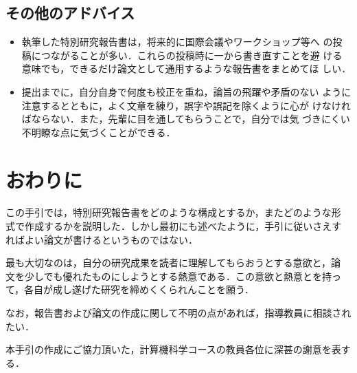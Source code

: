 \documentclass[master]{kuisthesis}		%
\def\|{\verb|}
\begin{document}
%% 雑誌に対しては，その「巻」と「発行年」のほか，「号」および（または）「月」を
%% 入れたほうが検索に便利である．号と月の入れ方はつぎの例による．
%% \begin{eqnarray*}
%% &\hbox{第4巻，第10号，1995年，10月発行の雑誌}\\
%% &\Big\Downarrow\\
%% &\hbox{Vol.~4, No.~10 (Oct.~1995)}.
%% \end{eqnarray*}

\subsection{その他のアドバイス}\label{subsec-others}


\begin{itemize}
  \item 執筆した特別研究報告書は，将来的に国際会議やワークショップ等へ
    の投稿につながることが多い．これらの投稿時に一から書き直すことを避
    ける意味でも，できるだけ論文として通用するような報告書をまとめてほ
    しい．
  \item 提出までに，自分自身で何度も校正を重ね，論旨の飛躍や矛盾のない
    ように注意するとともに，よく文章を練り，誤字や誤記を除くように心が
    けなければならない．また，先輩に目を通してもらうことで，自分では気
    づきにくい不明瞭な点に気づくことができる．
\end{itemize}

\section{おわりに}\label{sec-conclusion}

この手引では，特別研究報告書をどのような構成とするか，またどのような形
式で作成するかを説明した．しかし最初にも述べたように，手引に従いさえす
ればよい論文が書けるというものではない．

最も大切なのは，自分の研究成果を読者に理解してもらおうとする意欲と，論
文を少しでも優れたものにしようとする熱意である．この意欲と熱意とを持っ
て，各自が成し遂げた研究を締めくくられんことを願う．

なお，報告書および論文の作成に関して不明の点があれば，指導教員に相談されたい．

\acknowledgments				% 謝辞
本手引の作成にご協力頂いた，計算機科学コースの教員各位に深甚の謝意を表する．

\nocite{*}
			% 文献スタイルの指定
				% 参考文献の出力

						% 付録の開始
% \Appendix[付録：スタイルファイル{\tt kuistheis}の使用法]
% この手引で述べた教室所定の形式に適合した論文を\LaTeX で作成するために，スタ
% イルファイル\|kuisthesis|が用意されている．以下，\|kuisthesis|を使う
\end{document}
